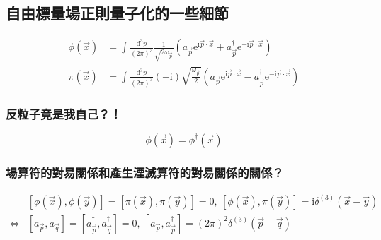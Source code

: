 \documentclass{article}
\begin{document}
\subsection{自由標量場正則量子化的一些細節}

$$
\begin{aligned}
\phi(\vec{x}) & =\int\frac{\mathrm{d}^3p}{(2\pi)^3}\frac{1}{\sqrt{2\omega_{\vec{p}}}}(a_{\vec{p}}\mathrm{e}^{\mathrm{i}\vec{p}\cdot\vec{x}}+a_{\vec{p}}^{\dagger}\mathrm{e}^{-\mathrm{i}\vec{p}\cdot\vec{x}})             \\
\pi(\vec{x})  & =\int\frac{\mathrm{d}^3p}{(2\pi)^3}(-\mathrm{i})\sqrt{\frac{\omega_{\vec{p}}}{2}}(a_{\vec{p}}\mathrm{e}^{\mathrm{i}\vec{p}\cdot\vec{x}}-a_{\vec{p}}^{\dagger}\mathrm{e}^{-\mathrm{i}\vec{p}\cdot\vec{x}})
\end{aligned}$$

\subsubsection{反粒子竟是我自己？！}

$$\phi(\vec{x})=\phi^{\dagger}(\vec{x})$$

\subsubsection{場算符的對易關係和產生湮滅算符的對易關係的關係？}

$$
\begin{aligned}
& [\phi(\vec{x}),\phi(\vec{y})]=[\pi(\vec{x}),\pi(\vec{y})]=0,\ [\phi(\vec{x}),\pi(\vec{y})]=\mathrm{i}\delta^{(3)}(\vec{x}-\vec{y})                    \\
\Leftrightarrow & [a_{\vec{p}},a_{\vec{q}}]=[a_{\vec{p}}^{\dagger},a_{\vec{q}}^{\dagger}]=0,\ [a_{\vec{p}},a_{\vec{p}}^{\dagger}]=(2\pi)^2\delta^{(3)}(\vec{p}-\vec{q})
\end{aligned}$$
\end{document}
